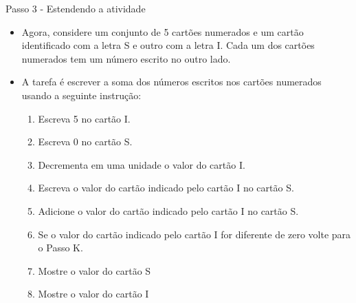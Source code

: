 \documentclass{beamer}
\begin{document}
\begin{frame}{Passo 3 - Estendendo a atividade}

\begin{itemize}

\item <1->Agora, considere um conjunto de 5 cartões numerados e um cartão identificado com a letra S e outro com a letra I. Cada um dos cartões numerados tem  um número escrito no outro lado. 

\begin{center}
\end{center}

\item <2->A tarefa é escrever a soma dos números escritos nos cartões numerados usando a seguinte instrução:

\begin{enumerate}
    \item <3->Escreva 5 no cartão I. 
    \item <4->Escreva 0 no cartão S.
    \item <5->Decrementa em uma unidade o valor do cartão I.
    \item <6->Escreva o valor do cartão indicado pelo cartão I no cartão S.
    \item <7->Adicione o valor do cartão indicado pelo cartão I no cartão S.
    \item <8->Se o valor do cartão indicado pelo cartão I for diferente de zero volte para o Passo K.
    \item <9->Mostre o valor do cartão S
    \item <10>Mostre o valor do cartão I
\end{enumerate}


\end{itemize}


\end{frame}
\end{document}
